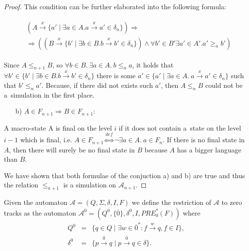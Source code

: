 \begin{proof}
 This condition can be further elaborated into the following formula:
 
 \begin{eqnarray}
 \begin{aligned}
  & (A \overset{x}{\rightarrow} \{a' \mid \exists a \in A. a
 \overset{x}{\rightarrow} a' \in \delta_n\}) \Rightarrow\\
  & \Rightarrow ( (B
 \overset{x}{\rightarrow} \{b' \mid \exists b \in B. b \overset{x}{\rightarrow}
 b' \in \delta_n\}) \wedge \forall b' \in B' \exists a' \in A'. a' \geq_n b')
 \end{aligned}
 \end{eqnarray}
 
 Since $A \leq_{n+1} B$, so $\forall b \in B.\ \exists a \in A.\ b \leq_n a$,
 it holds that $\forall b' \in \{b' \mid \exists b \in B. b
 \overset{x}{\rightarrow} b' \in \delta_n\}$ there is some $a' \in \{a' \mid
 \exists a \in A.\ a \overset{x}{\rightarrow} a' \in \delta_n\}$ such that $b'
 \leq_n a'$. Because, if there did not exists such $a'$, then $A \leq_n B$ could
 not be a~simulation in the first place.
 
 \begin{itemize}
   \item[b)] $A \in F_{n+1} \Rightarrow B \in F_{n+1}$:
 \end{itemize}
 A macro-state A is final on the level $i$ if it does not contain a~state on
 the level $i\minus 1$ which is final, i.e. $A \in F_{n+1}
 \overset{\mathit{def}}{\Leftrightarrow} \neg\exists a \in A.\ a \in F_n$. If
 there is no final state in $A$, then there will surely be no final state in $B$
 because $A$ has a bigger language than $B$.
 
 We have shown that both formulae of the conjuction a) and b) are true and thus
 the relation $\leq_{n+1}$ is a simulation on $\mathcal{A}_{n+1}$.
 
\end{proof}

% 

\begin{defz}
Given the automaton $\mathcal{A} = (Q, \Sigma, \delta, I, F)$ we define the
restriction of $\mathcal{A}$ to zero tracks as
the automaton $\mathcal{A}^0 = (Q^0, \{\overline{0}\}, \delta^0, I, PRE_0^*(F))$
where
\begin{eqnarray}
 Q^0 & = & \{q \in Q \mid \exists w \in \overline{0}^*: f
 \overset{w}{\longrightarrow} q, f \in I\},\\
 \delta^0 & = & \{p \overset{\overline{0}}{\longrightarrow} q \mid p
 \overset{\overline{0}}{\longrightarrow} q \in \delta\}.
\end{eqnarray}
\end{defz}

